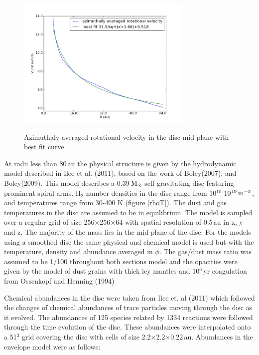 \documentclass[useAMS,usenatbib]{mn2e}
\begin{document}
\begin{figure}
 \includegraphics[width=84mm]{Figures/model/rotational_velocities.png}
 \label{velocity}
 \caption{Azimuthaly averaged rotational velocity in the disc mid-plane with best fit curve}
\end{figure}


At radii less than 80$\,$au the physical structure is given by the hydrodynamic model described in Ilee et al. (2011), based on the work of Boley(2007), and Boley(2009). This model describes a 0.39$\,\rm{M}_\odot$ self-gravitating disc featuring prominent spiral arms. H$_2$ number densities in the disc range from 10$^{10}$-10$^{19}\,\rm{m}^{-3}$, and temperatures range from 30-400 K (figure \ref{rhoT}). The dust and gas temperatures in the disc are assumed to be in equilibrium. The model is sampled over a regular grid of size 256$\times$256$\times$64 with spatial resolution of 0.5$\,$au in x, y and z. The majority of the mass lies in the mid-plane of the disc. For the models using a smoothed disc the same physical and chemical model is used but with the temperature, density and abundance averaged in $\phi$. The gas/dust mass ratio was assumed to be 1/100 throughout both sections model and the opacities were given by the model of dust grains with thick icy mantles and 10$^6\,$yr coagulation from Ossenkopf and Henning (1994)\newline

Chemical abundances in the disc were taken from Ilee et. al (2011) which followed the changes of chemical abundances of trace particles moving through the disc as it evolved. The abundances of 125 species related by 1334 reactions were followed through the time evolution of the disc. These abundances were interpolated onto a 51$^3$ grid covering the disc with cells of size 2.2$\times$2.2$\times$0.22$\,$au. Abundances in the envelope model were as follows:\newline
\end{document}
